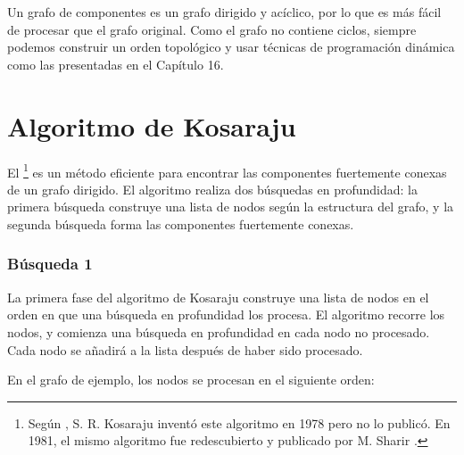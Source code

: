 Un grafo de componentes es un grafo dirigido y acíclico,
por lo que es más fácil de procesar que el grafo original.
Como el grafo no contiene ciclos,
siempre podemos construir un orden topológico y
usar técnicas de programación dinámica como las
presentadas en el Capítulo 16.

\section{Algoritmo de Kosaraju}


El \footnote{Según \cite{aho83},
S. R. Kosaraju inventó este algoritmo en 1978
pero no lo publicó. En 1981, el mismo algoritmo fue redescubierto
y publicado por M. Sharir \cite{sha81}.} es un
método eficiente para encontrar las componentes fuertemente conexas
de un grafo dirigido.
El algoritmo realiza dos búsquedas en profundidad:
la primera búsqueda construye una lista de nodos
según la estructura del grafo,
y la segunda búsqueda forma las componentes fuertemente conexas.

\subsubsection{Búsqueda 1}

La primera fase del algoritmo de Kosaraju construye
una lista de nodos en el orden en que una
búsqueda en profundidad los procesa.
El algoritmo recorre los nodos,
y comienza una búsqueda en profundidad en cada
nodo no procesado.
Cada nodo se añadirá a la lista
después de haber sido procesado.

En el grafo de ejemplo, los nodos se procesan
en el siguiente orden:
\begin{center}
\end{center}

